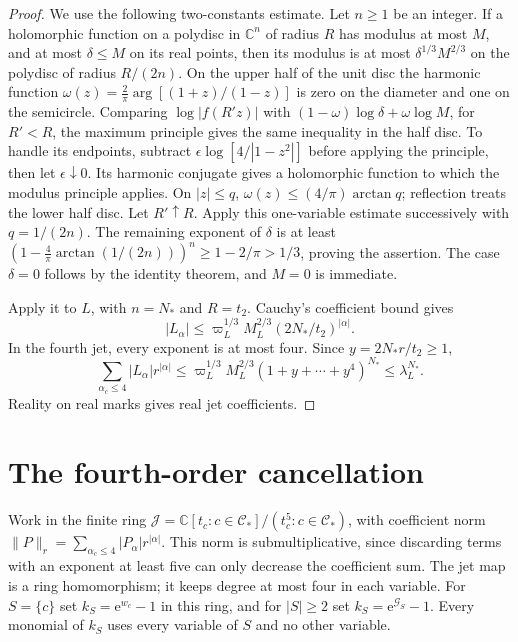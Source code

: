 \documentclass[11pt,letterpaper,reqno]{amsart}
\newcommand{\C}{\mathbb C}
\begin{document}
\begin{proof}
We use the following two-constants estimate.
Let $n\ge1$ be an integer. If a holomorphic function
on a polydisc in $\C^n$ of radius $R$ has modulus at most $M$, and
at most $\delta\le M$ on its real points,
then its modulus is at most $\delta^{1/3}M^{2/3}$
on the polydisc of radius $R/(2n)$.
On the upper
half of the unit disc the harmonic function
$\omega(z)=\frac2\pi\arg[(1+z)/(1-z)]$
is zero on the diameter and one on the
semicircle. Comparing $\log|f(R'z)|$
with $(1-\omega)\log\delta+\omega\log M$,
for $R'<R$, the maximum principle gives
the same inequality in the half disc.
To handle its endpoints, subtract
$\epsilon\log[4/|1-z^2|]$ before applying
the principle, then let $\epsilon\downarrow0$.
Its harmonic conjugate gives a holomorphic
function to which the modulus principle
applies. On $|z|\le q$, $\omega(z)\le
(4/\pi)\arctan q$; reflection treats the
lower half disc. Let $R'\uparrow R$.
Apply this one-variable estimate successively
with $q=1/(2n)$. The remaining exponent of
$\delta$ is at least
$(1-\frac4\pi\arctan(1/(2n)))^n
\ge1-2/\pi>1/3$, proving the assertion.
The case $\delta=0$ follows by the identity
theorem, and $M=0$ is immediate.

Apply it to $L$, with $n=N_*$ and $R=t_2$.
Cauchy's coefficient bound gives
\[
 |L_\alpha|\le\varpi_L^{1/3}M_L^{2/3}(2N_*/t_2)^{|\alpha|}.
\]
In the fourth jet, every exponent is at most
four. Since $y=2N_*r/t_2\ge1$,
\[
 \sum_{\alpha_c\le4}|L_\alpha|r^{|\alpha|}
   \le\varpi_L^{1/3}M_L^{2/3}
                 (1+y+\cdots+y^4)^{N_*}
   \le\lambda_L^{N_*}.
\]
Reality on real marks gives real jet coefficients.
\end{proof}

\section{The fourth-order cancellation}
\label{subsec:interacting-fourth-jet}

Work in the finite ring
$\mathcal J=\C[t_c:c\in\mathcal C_*]/(t_c^5:c\in\mathcal C_*)$,
with coefficient norm
$\|P\|_r=\sum_{\alpha_c\le4}|P_\alpha|r^{|\alpha|}$.
This norm is submultiplicative, since discarding
terms with an exponent at least five can only
decrease the coefficient sum.
The jet map is a ring homomorphism; it
keeps degree at most four in each variable.
For $S=\{c\}$ set $k_S=\mathrm e^{w_c}-1$ in this
ring, and for $|S|\ge2$ set
$k_S=\mathrm e^{\mathcal G_S}-1$.
Every monomial of $k_S$ uses every variable
of $S$ and no other variable.
\end{document}
